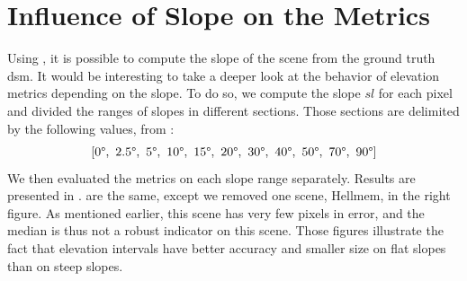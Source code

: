 \section{Influence of Slope on the Metrics}
Using , it is possible to compute the slope of the scene from the ground truth \acrshort{dsm}. It would be interesting to take a deeper look at the behavior of elevation metrics depending on the slope. To do so, we compute the slope $sl$ for each pixel and divided the ranges of slopes in different sections. Those sections are delimited by the following values, from \cite{hugonnet_uncertainty_2022}:
$$
[0\degree, ~2.5\degree, ~5\degree, ~10\degree, ~15\degree, ~20\degree, ~30\degree, ~40\degree, ~50\degree, ~70\degree, ~90\degree]
$$
We then evaluated the metrics on each slope range separately. Results are presented in .  are the same, except we removed one scene, Hellmem, in the right figure. As mentioned earlier, this scene has very few pixels in error, and the median is thus not a robust indicator on this scene. Those figures illustrate the fact that elevation intervals have better accuracy and smaller size on flat slopes than on steep slopes. 

